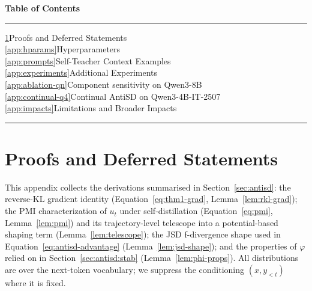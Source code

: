 \documentclass{llmxive}
\begin{document}
\noindent\textbf{Table of Contents}
\vspace{0.3em}
\hrule
\vspace{0.5em}
\noindent
\hyperref[app:proofs]{\ref{app:proofs}}\hspace{1em}Proofs and Deferred Statements\dotfill\pageref{app:proofs}\\[0.3em]
\hyperref[app:hparams]{\ref{app:hparams}}\hspace{1em}Hyperparameters\dotfill\pageref{app:hparams}\\[0.3em]
\hyperref[app:prompts]{\ref{app:prompts}}\hspace{1em}Self-Teacher Context Examples\dotfill\pageref{app:prompts}\\[0.3em]
\hyperref[app:experiments]{\ref{app:experiments}}\hspace{1em}Additional Experiments\dotfill\pageref{app:experiments}\\[0.3em]
\hspace*{1.5em}\hyperref[app:ablation-qn]{\ref{app:ablation-qn}}\hspace{1em}Component sensitivity on Qwen3-8B\dotfill\pageref{app:ablation-qn}\\[0.3em]
\hspace*{1.5em}\hyperref[app:continual-q4]{\ref{app:continual-q4}}\hspace{1em}Continual AntiSD on Qwen3-4B-IT-2507\dotfill\pageref{app:continual-q4}\\[0.3em]
\hyperref[app:impacts]{\ref{app:impacts}}\hspace{1em}Limitations and Broader Impacts\dotfill\pageref{app:impacts}
\vspace{0.5em}
\hrule
\vspace{1.5em}

\section{Proofs and Deferred Statements}
\label{app:proofs}

This appendix collects the derivations summarised in Section~\ref{sec:antisd}: the reverse-KL gradient identity (Equation~\eqref{eq:thm1-grad}, Lemma~\ref{lem:rkl-grad}); the PMI characterization of $u_t$ under self-distillation (Equation~\eqref{eq:pmi}, Lemma~\ref{lem:pmi}) and its trajectory-level telescope into a potential-based shaping term (Lemma~\ref{lem:telescope}); the JSD f-divergence shape used in Equation~\eqref{eq:antisd-advantage} (Lemma~\ref{lem:jsd-shape}); and the properties of $\varphi$ relied on in Section~\ref{sec:antisd:stab} (Lemma~\ref{lem:phi-props}). All distributions are over the next-token vocabulary; we suppress the conditioning $(x, y_{<t})$ where it is fixed.
\end{document}
